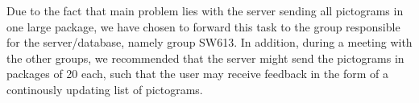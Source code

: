 Due to the fact that main problem lies with the server sending all pictograms in
one large package, we have chosen to forward this task to the group responsible
for the server/database, namely group SW613. In addition, during a meeting with
the other groups, we recommended that the server might send the pictograms in
packages of 20 each, such that the user may receive feedback in the form of a
continously updating list of pictograms.
 

